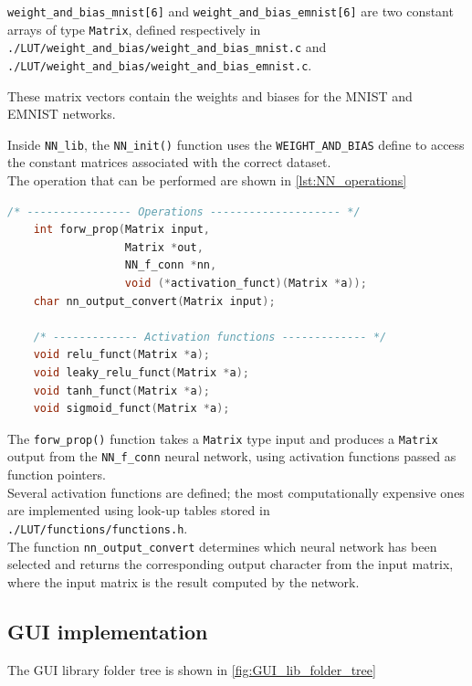\noindent
\texttt{weight\_and\_bias\_mnist[6]} and \texttt{weight\_and\_bias\_emnist[6]} are two constant arrays of type \texttt{Matrix}, defined respectively in \\
\texttt{./LUT/weight\_and\_bias/weight\_and\_bias\_mnist.c} and \\
\texttt{./LUT/weight\_and\_bias/weight\_and\_bias\_emnist.c}.

\noindent
These matrix vectors contain the weights and biases for the MNIST and EMNIST networks. 

\newpage
\noindent
Inside \texttt{NN\_lib}, the \texttt{NN\_init()} function uses the \texttt{WEIGHT\_AND\_BIAS} define to access the constant matrices associated with the correct dataset. \\
The operation that can be performed are shown in \autoref{lst:NN_operations}

\vspace{1em}
\begin{lstlisting}[language=C, caption={NN\_lib functions defined}, label={lst:NN_operations}, morekeywords={Matrix,\#include,\#define,\#ifdef,\#ifndef,\#else,\#endif}, alsoletter={\#}]
    /* ---------------- Operations -------------------- */
    int forw_prop(Matrix input, 
                  Matrix *out, 
                  NN_f_conn *nn, 
                  void (*activation_funct)(Matrix *a));
    char nn_output_convert(Matrix input);
    
    /* ------------- Activation functions ------------- */
    void relu_funct(Matrix *a);
    void leaky_relu_funct(Matrix *a);
    void tanh_funct(Matrix *a);
    void sigmoid_funct(Matrix *a);
\end{lstlisting}

\noindent
The \texttt{forw\_prop()} function takes a \texttt{Matrix} type input and produces a \texttt{Matrix} output from the \texttt{NN\_f\_conn} neural network, using activation functions passed as function pointers. \\
Several activation functions are defined; the most computationally expensive ones are implemented using look-up tables stored in \\
\texttt{./LUT/functions/functions.h}. \\
The function \texttt{nn\_output\_convert} determines which neural network has been selected and returns the corresponding output character from the input matrix, where the input matrix is the result computed by the network.

\newpage
\subsection{GUI implementation}
The GUI library folder tree is shown in \autoref{fig:GUI_lib_folder_tree}

